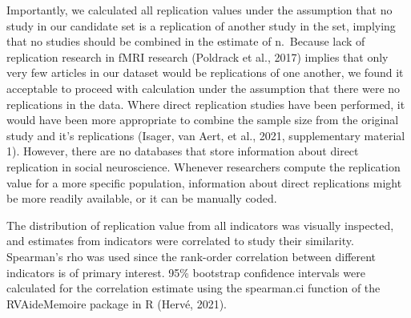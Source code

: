 \documentclass[
  man,floatsintext]{apa6}
\begin{document}
Importantly, we calculated all replication values under the assumption that no study in our candidate set is a replication of another study in the set, implying that no studies should be combined in the estimate of n.~Because lack of replication research in fMRI research (Poldrack et al., 2017) implies that only very few articles in our dataset would be replications of one another, we found it acceptable to proceed with calculation under the assumption that there were no replications in the data. Where direct replication studies have been performed, it would have been more appropriate to combine the sample size from the original study and it's replications (Isager, van Aert, et al., 2021, supplementary material 1). However, there are no databases that store information about direct replication in social neuroscience. Whenever researchers compute the replication value for a more specific population, information about direct replications might be more readily available, or it can be manually coded.

The distribution of replication value from all indicators was visually inspected, and estimates from indicators were correlated to study their similarity. Spearman's rho was used since the rank-order correlation between different indicators is of primary interest. 95\% bootstrap confidence intervals were calculated for the correlation estimate using the spearman.ci function of the RVAideMemoire package in R (Hervé, 2021).
\end{document}
